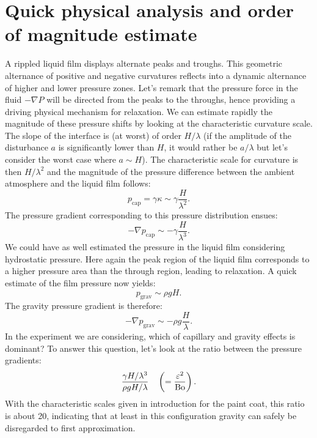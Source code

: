 \section{Quick physical analysis and order of magnitude estimate}
A rippled liquid film displays alternate peaks and troughs. This geometric alternance of positive and negative curvatures reflects into a dynamic alternance of higher and lower pressure zones. Let's remark that the pressure force in the fluid $-\nabla P$ will be directed from the peaks to the throughs, hence providing a driving physical mechanism for relaxation. We can estimate rapidly the magnitude of these pressure shifts by looking at the characteristic curvature scale. The slope of the interface is (at worst) of order $H/\lambda$ (if the amplitude of the disturbance $a$ is significantly lower than $H$, it would rather be $a/\lambda$ but let's consider the worst case where $a \sim H$). The characteristic scale for curvature is then $H/\lambda^2$ and the magnitude of the pressure difference between the ambient atmosphere and the liquid film follows:
\begin{equation}
p_\text{cap} = \gamma \kappa \sim \gamma \frac{H}{\lambda^2}.
\end{equation}
The pressure gradient corresponding to this pressure distribution ensues:
\begin{equation}
-\nabla p_\text{cap} \sim -\gamma \frac{H}{\lambda^3}.
\end{equation}
 We could have as well estimated the pressure in the liquid film considering hydrostatic pressure. Here again the peak region of the liquid film corresponds to a higher pressure area than the through region, leading to relaxation. A quick estimate of the film pressure now yields: 
\begin{equation}
p_\text{grav} \sim \rho g H.
\end{equation}
The gravity pressure gradient is therefore:
\begin{equation}
-\nabla p_\text{grav} \sim -\rho g \frac{H}{\lambda}.
\end{equation}
In the experiment we are considering, which of capillary and gravity effects is dominant? To answer this question, let's look at the ratio between the pressure gradients:
\begin{equation}
\frac{\gamma H / \lambda^3}{\rho g H / \lambda} \quad \left(= \frac{\varepsilon^2}{\text{Bo}}\right).
\end{equation}
With the characteristic scales given in introduction for the paint coat, this ratio is about 20, indicating that at least in this configuration gravity can safely be disregarded to first approximation.

